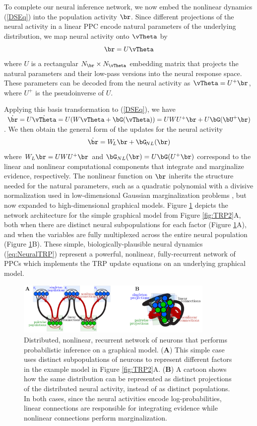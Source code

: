 \documentclass{article}
\begin{document}
To complete our neural inference network, we now embed the nonlinear dynamics (\ref{DSEq}) into the population activity $\br$. Since different projections of the neural activity in a linear PPC encode natural parameters of the underlying distribution, we map neural activity onto $\vTheta$ by
\begin{equation}
\br = U \vTheta
\label{eq:projection}
\end{equation}
where $U$ is a rectangular $N_\br\times N_\vTheta$ embedding matrix that projects the natural parameters and their low-pass versions into the neural response space. These parameters can be decoded from the neural activity as $\vTheta = U^{+}\br$, where $U^{+}$ is the pseudoinverse of $U$.

Applying this basis transformation to (\ref{DSEq}), we have $\dot{\br} = U \dot{\vTheta}=U(W\vTheta+\bG(\vTheta))=UW U^{+} \br + U\bG(\bU^+\br)$. We then obtain the general form of the updates for the neural activity
\begin{equation}
\label{eq:NeuralTRP}
\dot{\br} = W_{\!L}\br + \bG_{\!NL}(\br)
\end{equation}
where $W_L\br=UWU^+\br$ and $\bG_{NL}(\br)=U\bG(U^+\br)$ correspond to the linear and nonlinear computational components that integrate and marginalize evidence, respectively. The nonlinear function on $\br$ inherits the structure needed for the natural parameters, such as a quadratic polynomial with a divisive normalization used in low-dimensional Gaussian marginalization problems \cite{beck2011marginalization}, but now expanded to high-dimensional graphical models. Figure \ref{NN} depicts the network architecture for the simple graphical model from Figure \ref{fig:TRP2}A, both when there are distinct neural subpopulations for each factor (Figure \ref{NN}A), and when the variables are fully multiplexed across the entire neural population (Figure \ref{NN}B). These simple, biologically-plausible neural dynamics (\ref{eq:NeuralTRP}) represent a powerful, nonlinear, fully-recurrent network of PPCs which implements the TRP update equations on an underlying graphical model.

\begin{figure}[h]
	\centering
	\includegraphics[width=0.85\textwidth]{Figures/NetD.pdf}
	\caption{Distributed, nonlinear, recurrent network of neurons that performs probabilistic inference on a graphical model. ({\bf A}) This simple case uses distinct subpopulations of neurons to represent different factors in the example model in Figure \ref{fig:TRP2}A. ({\bf B}) A cartoon shows how the same distribution can be represented as distinct projections of the distributed neural activity, instead of as distinct populations. In both cases, since the neural activities encode log-probabilities, linear connections are responsible for integrating evidence while nonlinear connections perform marginalization.}
	\label{NN}
\end{figure}
 
\end{document}
